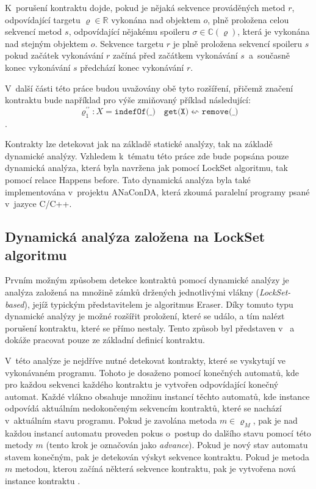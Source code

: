 K~porušení kontraktu dojde, pokud je nějaká sekvence prováděných metod $r$, odpovídající targetu $\varrho \in \mathbb{R}$ vykonána nad objektem $o$, plně proložena celou sekvencí metod $s$, odpovídající nějakému spoileru $\sigma \in \mathbb{C}(\varrho)$, která je vykonána nad stejným objektem $o$. Sekvence targetu $r$ je plně proložena sekvencí spoileru $s$ pokud začátek vykonávání $r$ začíná před začátkem vykonávání $s$~a~současně konec vykonávání $s$ předchází konec vykonávání $r$. \cite{cite:contract2}

V~další části této práce budou uvažovány obě tyto rozšíření, přičemž značení kontraktu bude například pro výše zmiňovaný příklad následující:
$$\varrho_1^{\prime\prime}: X = \texttt{indefOf(\_)} \quad \texttt{get(X)} \leftsquigarrow \texttt{remove(\_)}$$.

Kontrakty lze detekovat jak na základě statické analýzy, tak na základě dynamické analýzy. Vzhledem k~tématu této práce zde bude popsána pouze dynamická analýza, která byla navržena jak pomocí LockSet algoritmu, tak pomocí relace Happens before. Tato dynamická analýza byla také implementována v~projektu ANaConDA, která zkoumá paralelní programy psané v~jazyce C/C++.


\subsection{Dynamická analýza založena na LockSet algoritmu}

Prvním možným způsobem detekce kontraktů pomocí dynamické analýzy je analýza založená na množině zámků držených jednotlivými vlákny (\textit{LockSet-based}), jejíž typickým představitelem je algoritmus Eraser. Díky tomuto typu dynamické analýzy je možné rozšířit proložení, které se událo, a tím nalézt porušení kontraktu, které se přímo nestaly. Tento způsob byl představen v~\cite{cite:contract1} a dokáže pracovat pouze ze základní definicí kontraktu.

V~této analýze je nejdříve nutné detekovat kontrakty, které se vyskytují ve vykonávaném programu. Tohoto je dosaženo pomocí konečných automatů, kde pro každou sekvenci každého kontraktu je vytvořen odpovídající konečný automat. Každé vlákno obsahuje množinu instancí těchto automatů, kde instance odpovídá aktuálním nedokončeným sekvencím kontraktů, které se nachází v~aktuálním stavu programu. Pokud je zavolána metoda $m \in \varrho_M$, pak je nad každou instancí automatu proveden pokus o~postup do dalšího stavu pomocí této metody $m$ (tento krok je označován jako \textit{advance}). Pokud je nový stav automatu stavem konečným, pak je detekován výskyt sekvence kontraktu. Pokud je metoda $m$ metodou, kterou začíná některá sekvence kontraktu, pak je vytvořena nová instance kontraktu \cite{cite:contract1}.

